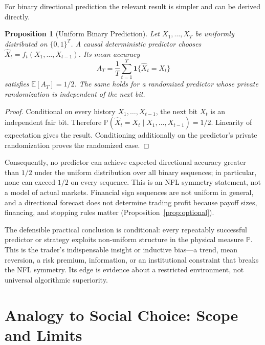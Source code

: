 \documentclass[aps,pra,reprint,superscriptaddress,amsmath,amssymb,floatfix]{revtex4-2}
\theoremstyle{plain}
\newtheorem{proposition}[theorem]{Proposition}
\theoremstyle{definition}
\theoremstyle{remark}
\begin{document}
For binary directional prediction the relevant result is simpler and can be
derived directly.

\begin{proposition}[Uniform Binary Prediction]
  \label{prop:binary}
  Let \(X_1,\ldots,X_T\) be uniformly distributed on \(\{0,1\}^T\). A causal
  deterministic predictor chooses
  \(\widehat X_t=f_t(X_1,\ldots,X_{t-1})\). Its mean accuracy
  \[
    A_T=\frac1T\sum_{t=1}^T
      \mathbf{1}\{\widehat X_t=X_t\}
  \]
  satisfies \(\mathbb{E}[A_T]=1/2\). The same holds for a randomized predictor
  whose private randomization is independent of the next bit.
\end{proposition}

\begin{proof}
Conditional on every history \(X_1,\ldots,X_{t-1}\), the next bit \(X_t\) is
an independent fair bit. Therefore
\(\mathbb{P}(\widehat X_t=X_t\mid X_1,\ldots,X_{t-1})=1/2\).
Linearity of expectation gives the result. Conditioning additionally on the
predictor's private randomization proves the randomized case.
\end{proof}

Consequently, no predictor can achieve expected directional accuracy greater
than \(1/2\) under the uniform distribution over all binary sequences; in
particular, none can exceed \(1/2\) on every sequence. This is an NFL symmetry
statement, not a model of actual markets. Financial sign sequences are not
uniform in general, and a directional forecast does not determine trading
profit because payoff sizes, financing, and stopping rules matter
(Proposition~\ref{prop:optional}).

The defensible practical conclusion is conditional: every repeatably
successful predictor or strategy exploits non-uniform structure in the
physical measure \(\mathbb{P}\). This is the trader's indispensable insight or
inductive bias---a trend, mean reversion, a risk premium, information, or an
institutional constraint that breaks the NFL symmetry. Its edge is evidence
about a restricted environment, not universal algorithmic superiority.

\section{Analogy to Social Choice: Scope and Limits}
\label{sec:arrow}
\end{document}
